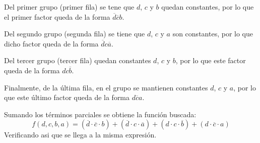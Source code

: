 \begin{centering}
    \begin{Karnaugh}
    \end{Karnaugh}
\par\end{centering}

Del primer grupo (primer fila) se tene que $d$, $c$ y $b$ quedan 
constantes, por lo que el primer factor queda de la forma 
$ \overline{d} \overline{c} b$.\par
Del segundo grupo (segunda fila) se tiene que $d$, $c$ y $a$ son 
constantes, por lo que dicho factor queda de la forma $ \overline{d} c \overline{a}$.\par
Del tercer grupo (tercer fila) quedan constantes $d$, $c$ y $b$, por lo 
que este factor queda de la forma $d c \overline{b}$.\par
Finalmente, de la última fila, en el grupo se mantienen constantes
$d$, $c$ y $a$, por lo que este último factor queda de la forma 
$d \overline{c} a$.\par
Sumando los términos parciales se obtiene la función buscada:
\[
    \boxed{f(d,c,b,a)=(\overline{d} \cdot \overline{c} \cdot b)+
    (\overline{d} \cdot c \cdot \overline{a})+
    (d \cdot c \cdot \overline{b})+  
    (d \cdot \overline{c} \cdot a)}     
\]
Verificando asi que se llega a la misma expresión.


